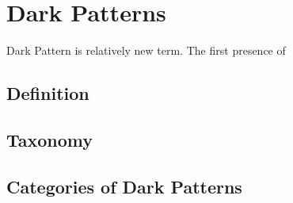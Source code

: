 \chapter{Dark Patterns}
Dark Pattern is relatively new term. The first presence of 
\section{Definition}
\blind[3]
\section{Taxonomy}
\blind[3]
\section{Categories of Dark Patterns}
\blind[15]